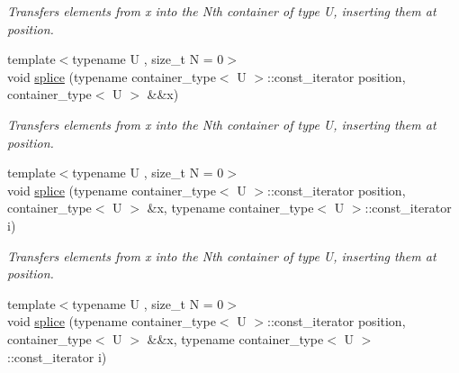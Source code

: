 \begin{DoxyCompactItemize}
\begin{DoxyCompactList}\small\item\em Transfers elements from x into the Nth container of type U, inserting them at position. \end{DoxyCompactList}\item 
\hypertarget{classheterogeneous_1_1heterolist_3_01_t_00_01_types_8_8_8_4_ac26cb7911811ed8dbfe61a8f17a591a8}{}{\footnotesize template$<$typename U , size\+\_\+t N = 0$>$ }\\void \hyperlink{classheterogeneous_1_1heterolist_3_01_t_00_01_types_8_8_8_4_ac26cb7911811ed8dbfe61a8f17a591a8}{splice} (typename container\+\_\+type$<$ U $>$\+::const\+\_\+iterator position, container\+\_\+type$<$ U $>$ \&\&x)\label{classheterogeneous_1_1heterolist_3_01_t_00_01_types_8_8_8_4_ac26cb7911811ed8dbfe61a8f17a591a8}

\begin{DoxyCompactList}\small\item\em Transfers elements from x into the Nth container of type U, inserting them at position. \end{DoxyCompactList}\item 
\hypertarget{classheterogeneous_1_1heterolist_3_01_t_00_01_types_8_8_8_4_ac2511a282b1a18255810cbeb7462b617}{}{\footnotesize template$<$typename U , size\+\_\+t N = 0$>$ }\\void \hyperlink{classheterogeneous_1_1heterolist_3_01_t_00_01_types_8_8_8_4_ac2511a282b1a18255810cbeb7462b617}{splice} (typename container\+\_\+type$<$ U $>$\+::const\+\_\+iterator position, container\+\_\+type$<$ U $>$ \&x, typename container\+\_\+type$<$ U $>$\+::const\+\_\+iterator i)\label{classheterogeneous_1_1heterolist_3_01_t_00_01_types_8_8_8_4_ac2511a282b1a18255810cbeb7462b617}

\begin{DoxyCompactList}\small\item\em Transfers elements from x into the Nth container of type U, inserting them at position. \end{DoxyCompactList}\item 
\hypertarget{classheterogeneous_1_1heterolist_3_01_t_00_01_types_8_8_8_4_a0eeb30472428f5912442f636da69eb4a}{}{\footnotesize template$<$typename U , size\+\_\+t N = 0$>$ }\\void \hyperlink{classheterogeneous_1_1heterolist_3_01_t_00_01_types_8_8_8_4_a0eeb30472428f5912442f636da69eb4a}{splice} (typename container\+\_\+type$<$ U $>$\+::const\+\_\+iterator position, container\+\_\+type$<$ U $>$ \&\&x, typename container\+\_\+type$<$ U $>$\+::const\+\_\+iterator i)\label{classheterogeneous_1_1heterolist_3_01_t_00_01_types_8_8_8_4_a0eeb30472428f5912442f636da69eb4a}


\end{DoxyCompactItemize}
